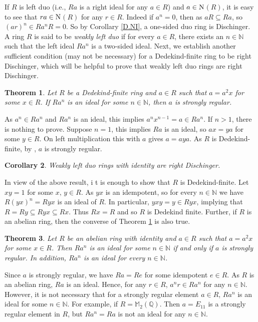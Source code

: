 \documentclass[12pt]{article}
\makeatletter
\theoremstyle{plain}
\newtheorem{thm}{Theorem}[section]
\newtheorem{cor}[thm]{Corollary}
\theoremstyle{definition}
\renewenvironment{proof}[1][\proofname]{%
	\par\pushQED{\qed}%
	\normalfont %
	\topsep6\p@\@plus6\p@\relax
	\trivlist
	\item[\hskip\labelsep\bfseries #1\@addpunct{.}]%
}{%
	\popQED\endtrivlist\@endpefalse
}
\renewcommand{\proofname}{Proof}
\makeatother
\begin{document}
	\vspace{3mm}
	If $R$ is left duo (i.e., $Ra$ is a right ideal for any $a \in R$) and $a \in \rm{N}$$(R)$, it is easy to see that $ra \in \rm{N}$$(R)$ for any $r\in R$. Indeed if $a^n=0$, then as $aR \subseteq Ra$, so  $(ar)^n \in Ra^nR = 0$. So by Corollary \ref{D.NI}, a one-sided duo ring is Dischinger. A ring $R$ is said to be \emph{weakly left duo} if for every $a \in R$, there exists an $n \in \mathbb{N}$ such that the left ideal $Ra^n$ is a two-sided ideal. Next, we establish another sufficient condition (may not be necessary) for a Dedekind-finite ring to be right Dischinger, which will be helpful to prove that weakly left duo rings are right Dischinger.
	\begin{thm}\label{D.wld}
		Let $R$ be a Dedekind-finite ring and $a \in R$ such that $a=a^2x$ for some $x \in R$. If $Ra^n$ is an ideal for some $n\in \mathbb{N}$, then $a$ is strongly regular. 
	\end{thm}
	\begin{proof}
		As $a^n \in Ra^n$ and $Ra^n$ is an ideal, this implies $a^nx^{n-1} = a \in Ra^n$. If $n > 1$, there is nothing to prove. Suppose $n=1$, this implies $Ra$ is an ideal, so $ax=ya$ for some $y \in R$. On left multiplication this with $a$ gives $a=aya$. As $R$ is Dedekind-finite, by \cite[Lemma 3.3]{Dit}, $a$ is strongly regular. 
	\end{proof}
	\begin{cor}\label{D.duo}
		Weakly left duo rings with identity are right Dischinger.     
	\end{cor}
	\begin{proof}
		In view of the above result, i t is enough to show that $R$ is Dedekind-finite. Let $xy = 1$ for some $x,\, y \in R$. As $yx$ is an idempotent, so for every $n \in \mathbb{N}$ we have $R(yx)^n = Ryx$ is an ideal of $R$. In particular, $yxy = y \in Ryx$, implying that $R = Ry \subseteq Ryx \subseteq Rx$. Thus $Rx = R$ and so $R$ is Dedekind finite.
	\end{proof}
	Further, if $R$ is an abelian ring, then the converse of Theorem \ref{D.wld} is also true. 
	\begin{thm}
		Let $R$ be an abelian ring with identity and $a \in R$ such that $a=a^2x$ for some $x \in R$. Then $Ra^n$ is an ideal for some $n\in \mathbb{N}$ if and only if $a$ is strongly regular. In addition, $Ra^n$ is an ideal for every $n \in \mathbb{N}$.
	\end{thm}
	\begin{proof}
		Since $a$ is strongly regular, we have $Ra=Re$ for some idempotent $e \in R$. As $R$ is an abelian ring, $Ra$ is an ideal. Hence, for any $r \in R$, $a^nr \in Ra^n$ for any $n \in \mathbb{N}$.
	\end{proof}
	However, it is not necessary that for a strongly regular element $a \in R$, $Ra^n$ is an ideal for some $n \in \mathbb{N}$. For example, if $R=\mathbb{M}_2(\mathbb{Q})$. Then $a=E_{11}$ is a strongly regular element in $R$, but $Ra^n=Ra$ is not an ideal for any $n\in \mathbb{N}.$
	
\end{document}
